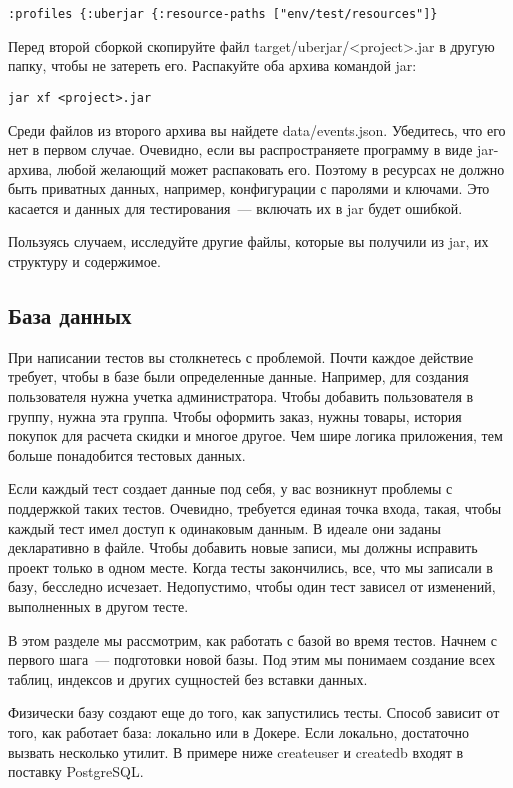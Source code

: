 \begin{verbatim}
:profiles {:uberjar {:resource-paths ["env/test/resources"]}
\end{verbatim}

Перед второй сборкой скопируйте файл target/uberjar/<project>.jar в другую
папку, чтобы не затереть его. Распакуйте оба архива командой jar:

\begin{verbatim}
jar xf <project>.jar
\end{verbatim}

Среди файлов из второго архива вы найдете data/events.json. Убедитесь, что его
нет в первом случае. Очевидно, если вы распространяете программу в виде
jar-архива, любой желающий может распаковать его. Поэтому в ресурсах не должно
быть приватных данных, например, конфигурации с паролями и ключами. Это касается
и данных для тестирования~--- включать их в jar будет ошибкой.

Пользуясь случаем, исследуйте другие файлы, которые вы получили из jar, их
структуру и содержимое.

\subsection{База данных}

При написании тестов вы столкнетесь с проблемой. Почти каждое действие требует,
чтобы в базе были определенные данные. Например, для создания пользователя нужна
учетка администратора. Чтобы добавить пользователя в группу, нужна эта
группа. Чтобы оформить заказ, нужны товары, история покупок для расчета скидки и
многое другое. Чем шире логика приложения, тем больше понадобится тестовых
данных.

Если каждый тест создает данные под себя, у вас возникнут проблемы с поддержкой
таких тестов. Очевидно, требуется единая точка входа, такая, чтобы каждый тест
имел доступ к одинаковым данным. В идеале они заданы декларативно в файле. Чтобы
добавить новые записи, мы должны исправить проект только в одном месте. Когда
тесты закончились, все, что мы записали в базу, бесследно исчезает. Недопустимо,
чтобы один тест зависел от изменений, выполненных в другом тесте.

В этом разделе мы рассмотрим, как работать с базой во время тестов. Начнем с
первого шага~--- подготовки новой базы. Под этим мы понимаем создание всех таблиц,
индексов и других сущностей без вставки данных.

Физически базу создают еще до того, как запустились тесты. Способ зависит от
того, как работает база: локально или в Докере. Если локально, достаточно
вызвать несколько утилит. В примере ниже createuser и createdb входят в поставку
PostgreSQL.

